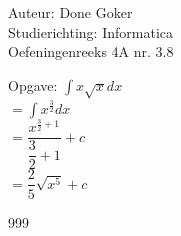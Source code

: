 \documentclass[a4paper]{article}
\begin{document}
  
\noindent \large Auteur: Done Goker \\
\noindent \large Studierichting: Informatica\\
\noindent \large Oefeningenreeks 4A nr. 3.8\\

\medskip

\normalsize
Opgave:
$\displaystyle\int x\sqrt{x}dx$ \\

$= \displaystyle\int x ^{\tfrac{3}{2}} dx$ \\

$= \dfrac{x^{\tfrac{3}{2} + 1}}{\dfrac{3}{2} + 1} + c$ \\

$= \dfrac{2}{5} \sqrt{x^5} + c$ \\
 

\begin{thebibliography}{999}
\end{thebibliography}
\end{document}

